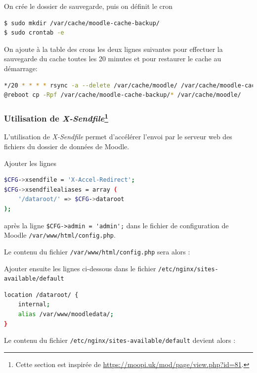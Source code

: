 \documentclass[11pt]{article}
\begin{document}
On crée le dossier de sauvegarde, puis on définit le cron
\begin{lstlisting}[language=bash]
$ sudo mkdir /var/cache/moodle-cache-backup/
$ sudo crontab -e
\end{lstlisting}

On ajoute à la table des crons les deux lignes suivantes pour effectuer la sauvegarde du cache toutes les 20 minutes et pour restaurer le cache au démarrage:
\begin{lstlisting}[language=bash]
*/20 * * * * rsync -a --delete /var/cache/moodle/ /var/cache/moodle-cache-backup/
@reboot cp -Rpf /var/cache/moodle-cache-backup/* /var/cache/moodle/
\end{lstlisting}

\subsubsection[Utilisation de \emph{X-Sendfile}]{Utilisation de \emph{X-Sendfile}\footnote{Cette section est inspirée de \url{https://moopi.uk/mod/page/view.php?id=81}.}}

L'utilisation de \emph{X-Sendfile} permet d'accélérer l'envoi par le serveur web des fichiers du dossier de données de Moodle.

Ajouter les lignes
\begin{lstlisting}[language=bash]
$CFG->xsendfile = 'X-Accel-Redirect';
$CFG->xsendfilealiases = array (
    '/dataroot/' => $CFG->dataroot
);
\end{lstlisting}
après la ligne \lstinline{$CFG->admin = 'admin';} dans le fichier de configuration de Moodle \lstinline{/var/www/html/config.php}.


Le contenu du fichier \lstinline{/var/www/html/config.php} sera alors :


Ajouter ensuite les lignes ci-dessous dans le fichier \lstinline{/etc/nginx/sites-available/default}

\begin{lstlisting}[language=bash]
location /dataroot/ {
    internal;
    alias /var/www/moodledata/;
}
\end{lstlisting}

Le contenu du fichier \lstinline{/etc/nginx/sites-available/default} devient alors :

\end{document}
